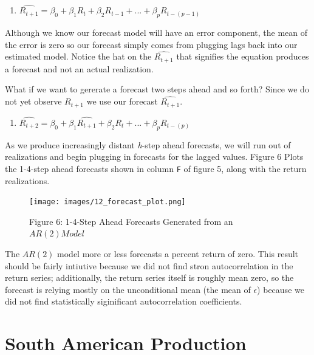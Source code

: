 \documentclass[
  letterpaper,
  DIV=11,
  numbers=noendperiod]{scrreprt}
\providecommand{\tightlist}{%
  \setlength{\itemsep}{0pt}\setlength{\parskip}{0pt}}\usepackage{longtable,booktabs,array}
\begin{document}
\begin{enumerate}
\def\labelenumi{\arabic{enumi}.}
\setcounter{enumi}{3}
\tightlist
\item
  \(\hat{R_{t+1}} = \beta_0 + \beta_1R_{t} + \beta_2R_{t-1}+ ... + \beta_{p}R_{t-(p-1)}\)
\end{enumerate}

Although we know our forecast model will have an error component, the
mean of the error is zero so our forecast simply comes from plugging
lags back into our estimated model. Notice the hat on the
\(\hat{R_{t+1}}\) that signifies the equation produces a forecast and
not an actual realization.

What if we want to gererate a forecast two steps ahead and so forth?
Since we do not yet observe \(R_{t+1}\) we use our forecast
\(\hat{R_{t+1}}\).

\begin{enumerate}
\def\labelenumi{\arabic{enumi}.}
\setcounter{enumi}{4}
\tightlist
\item
  \(\hat{R_{t+2}} = \beta_0 + \beta_1\hat{R_{t+1}} + \beta_2R_{t}+ ... + \beta_{p}R_{t-(p)}\)
\end{enumerate}

As we produce increasingly distant \emph{h}-step ahead forecasts, we
will run out of realizations and begin plugging in forecasts for the
lagged values. Figure 6 Plots the 1-4-step ahead forecasts shown in
column \texttt{F} of figure 5, along with the return realizations.

\begin{figure}[H]

{\centering \texttt{[image: images/12\_forecast\_plot.png]}

}

\caption{Figure 6: 1-4-Step Ahead Forecasts Generated from an
\(AR(2) Model\)}

\end{figure}%

The \(AR(2)\) model more or less forecasts a percent return of zero.
This result should be fairly intiutive because we did not find stron
autocorrelation in the return series; additionally, the return series
itself is roughly mean zero, so the forecast is relying mostly on the
unconditional mean (the mean of \(\epsilon\)) because we did not find
statistically siginificant autocorrelation coefficients.


\chapter{South American Production}\label{south-american-production}
\end{document}

